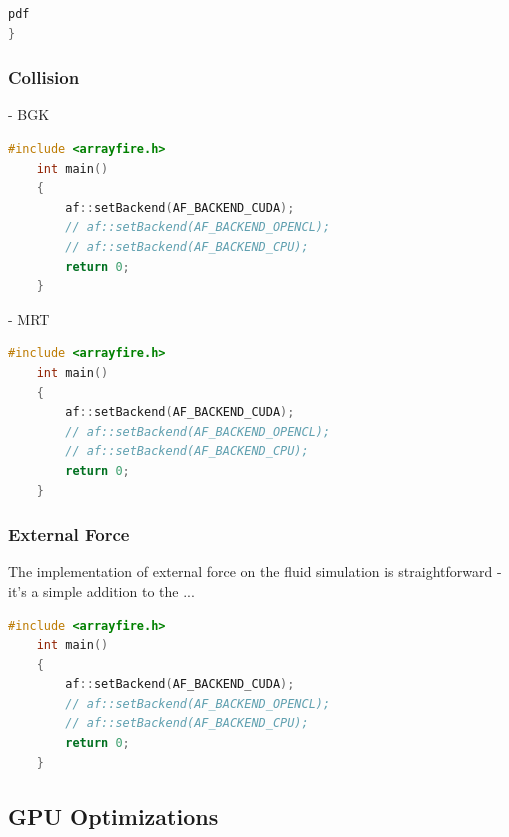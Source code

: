 \begin{lstlisting}[language=Rust, caption=Streaming with \texttt{shift} function for three dimensions with 27 discrete speeds (D3Q27)., label=rust-streaming-3d]
	pdf
}
\end{lstlisting}


\subsubsection{Collision}



- BGK \\

\begin{lstlisting}[language=Cpp, caption=C++ code for setting different computing backends., label=cpp-backends]
	#include <arrayfire.h>
	int main()
	{
		af::setBackend(AF_BACKEND_CUDA);
		// af::setBackend(AF_BACKEND_OPENCL);
		// af::setBackend(AF_BACKEND_CPU);
		return 0;
	}
\end{lstlisting}

- MRT \\

\begin{lstlisting}[language=Cpp, caption=C++ code for setting different computing backends., label=cpp-backends]
	#include <arrayfire.h>
	int main()
	{
		af::setBackend(AF_BACKEND_CUDA);
		// af::setBackend(AF_BACKEND_OPENCL);
		// af::setBackend(AF_BACKEND_CPU);
		return 0;
	}
\end{lstlisting}

\subsubsection{External Force}

The implementation of external force on the fluid simulation is straightforward - it's a simple addition to the ...

\begin{lstlisting}[language=Cpp, caption=C++ code for setting different computing backends., label=cpp-backends]
	#include <arrayfire.h>
	int main()
	{
		af::setBackend(AF_BACKEND_CUDA);
		// af::setBackend(AF_BACKEND_OPENCL);
		// af::setBackend(AF_BACKEND_CPU);
		return 0;
	}
\end{lstlisting}

\subsection{GPU Optimizations}
\label{optimizations-for-gpu}

